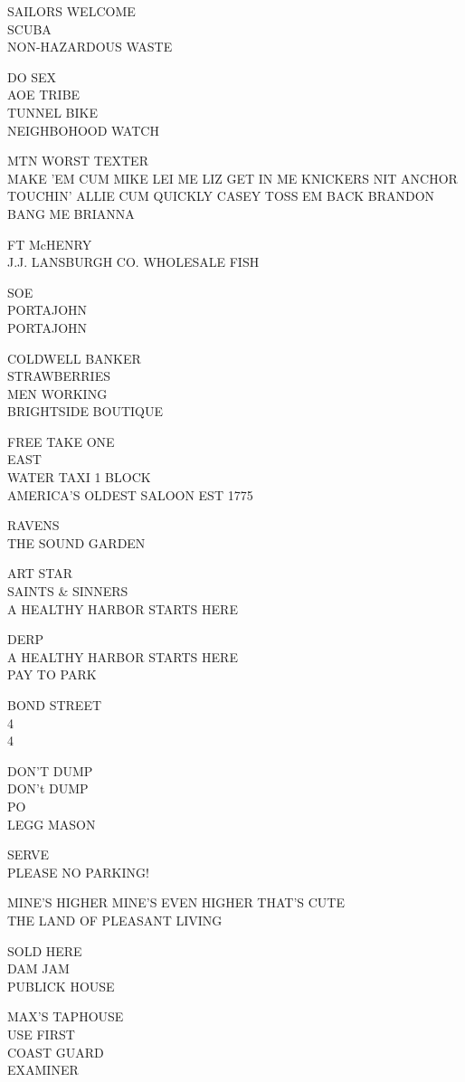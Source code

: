 \documentclass[10pt,letterpaper]{article}
\begin{document}
SAILORS WELCOME\\
SCUBA\\
NON{-}HAZARDOUS WASTE

DO SEX\\
AOE TRIBE\\
TUNNEL BIKE\\
NEIGHBOHOOD WATCH

MTN WORST TEXTER\\
MAKE 'EM CUM MIKE LEI ME LIZ GET IN ME KNICKERS NIT ANCHOR TOUCHIN' ALLIE CUM QUICKLY CASEY TOSS EM BACK BRANDON BANG ME BRIANNA

FT McHENRY\\
J.J. LANSBURGH CO. WHOLESALE FISH

SOE\\
PORTAJOHN\\
PORTAJOHN

COLDWELL BANKER\\
STRAWBERRIES\\
MEN WORKING\\
BRIGHTSIDE BOUTIQUE

FREE TAKE ONE\\
EAST\\
WATER TAXI 1 BLOCK\\
AMERICA'S OLDEST SALOON EST 1775

RAVENS\\
THE SOUND GARDEN

ART STAR\\
SAINTS \& SINNERS\\
A HEALTHY HARBOR STARTS HERE

DERP\\
A HEALTHY HARBOR STARTS HERE\\
PAY TO PARK

BOND STREET\\
4\\
4

DON'T DUMP\\
DON't DUMP\\
PO\\
LEGG MASON

SERVE\\
PLEASE NO PARKING!

MINE'S HIGHER MINE'S EVEN HIGHER THAT'S CUTE\\
THE LAND OF PLEASANT LIVING

SOLD HERE\\
DAM JAM\\
PUBLICK HOUSE

MAX'S TAPHOUSE\\
USE FIRST\\
COAST GUARD\\
EXAMINER
\end{document}
